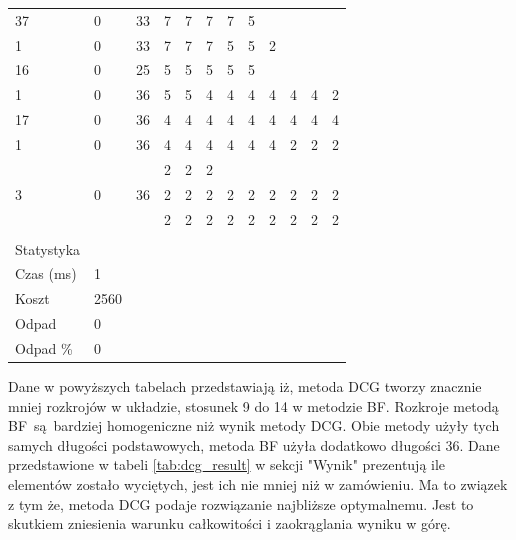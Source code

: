\begin{longtable}{llllllllllll}
  37                   & 0        & 33        & 7                & 7  & 7  & 7 & 5 &   &   &   &   \\
  1                    & 0        & 33        & 7                & 7  & 7  & 5 & 5 & 2 &   &   &   \\
  16                   & 0        & 25        & 5                & 5  & 5  & 5 & 5 &   &   &   &   \\
  1                    & 0        & 36        & 5                & 5  & 4  & 4 & 4 & 4 & 4 & 4 & 2 \\
  17                   & 0        & 36        & 4                & 4  & 4  & 4 & 4 & 4 & 4 & 4 & 4 \\
  1                    & 0        & 36        & 4                & 4  & 4  & 4 & 4 & 4 & 2 & 2 & 2 \\
                       &          &           & 2                & 2  & 2  &   &   &   &   &   &   \\
  3                    & 0        & 36        & 2                & 2  & 2  & 2 & 2 & 2 & 2 & 2 & 2 \\
                       &          &           & 2                & 2  & 2  & 2 & 2 & 2 & 2 & 2 & 2 \\
                       &          &           &                  &    &    &   &   &   &   &   &   \\
  Statystyka            &          &           &                  &    &    &   &   &   &   &   &   \\
Czas (ms)       & 1        &           &                  &    &    &   &   &   &   &   &   \\
  Koszt           & 2560     &           &                  &    &    &   &   &   &   &   &   \\
  Odpad                & 0        &           &                  &    &    &   &   &   &   &   &   \\
  Odpad \%        & 0        &           &                  &    &    &   &   &   &   &   & \\
  \hline
\end{longtable}

Dane w powyższych tabelach przedstawiają iż, metoda DCG tworzy znacznie mniej rozkrojów w układzie, stosunek 9 do 14 w metodzie BF. Rozkroje metodą BF są bardziej homogeniczne niż wynik metody DCG. Obie metody użyły tych samych długości podstawowych, metoda BF użyła dodatkowo długości 36. Dane przedstawione w tabeli \ref{tab:dcg_result} w sekcji "Wynik" prezentują ile elementów zostało wyciętych, jest ich nie mniej niż w zamówieniu. Ma to związek z tym że, metoda DCG podaje rozwiązanie najbliższe optymalnemu. Jest to skutkiem zniesienia warunku całkowitości i zaokrąglania wyniku w górę.

